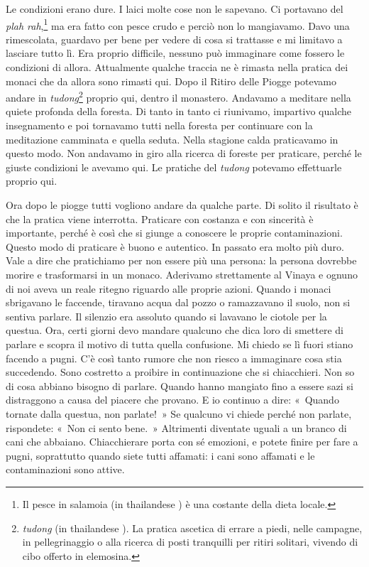 Le condizioni erano dure. I laici molte cose non le sapevano. Ci
portavano del \emph{plah rah},\footnote{Il pesce in salamoia (in
  thailandese )
  è una costante della dieta locale.} ma era fatto con pesce crudo e
perciò non lo mangiavamo. Davo una rimescolata, guardavo per bene per
vedere di cosa si trattasse e mi limitavo a lasciare tutto lì. Era
proprio difficile, nessuno può immaginare come fossero le condizioni di
allora. Attualmente qualche traccia ne è rimasta nella pratica dei
monaci che da allora sono rimasti qui. Dopo il Ritiro delle Piogge
potevamo andare in \emph{tudong}\footnote{\emph{tudong} (in thailandese
  ). La pratica ascetica di errare a piedi, nelle campagne, in
  pellegrinaggio o alla ricerca di posti tranquilli per ritiri solitari,
  vivendo di cibo offerto in elemosina.} proprio qui, dentro il
monastero. Andavamo a meditare nella quiete profonda della foresta. Di
tanto in tanto ci riunivamo, impartivo qualche insegnamento e poi
tornavamo tutti nella foresta per continuare con la meditazione
camminata e quella seduta. Nella stagione calda praticavamo in questo
modo. Non andavamo in giro alla ricerca di foreste per praticare, perché
le giuste condizioni le avevamo qui. Le pratiche del \emph{tudong}
potevamo effettuarle proprio qui.

Ora dopo le piogge tutti vogliono andare da qualche parte. Di solito il
risultato è che la pratica viene interrotta. Praticare con costanza e
con sincerità è importante, perché è così che si giunge a conoscere le
proprie contaminazioni. Questo modo di praticare è buono e autentico. In
passato era molto più duro. Vale a dire che pratichiamo per non essere
più una persona: la persona dovrebbe morire e trasformarsi in un monaco.
Aderivamo strettamente al Vinaya e ognuno di noi aveva un reale ritegno
riguardo alle proprie azioni. Quando i monaci sbrigavano le faccende,
tiravano acqua dal pozzo o ramazzavano il suolo, non si sentiva parlare.
Il silenzio era assoluto quando si lavavano le ciotole per la questua.
Ora, certi giorni devo mandare qualcuno che dica loro di smettere di
parlare e scopra il motivo di tutta quella confusione. Mi chiedo se lì
fuori stiano facendo a pugni. C'è così tanto rumore che non riesco a
immaginare cosa stia succedendo. Sono costretto a proibire in
continuazione che si chiacchieri. Non so di cosa abbiano bisogno di
parlare. Quando hanno mangiato fino a essere sazi si distraggono a causa
del piacere che provano. E io continuo a dire: «~Quando tornate dalla
questua, non parlate!~» Se qualcuno vi chiede perché non parlate,
rispondete: «~Non ci sento bene.~» Altrimenti diventate uguali a un
branco di cani che abbaiano. Chiacchierare porta con sé emozioni, e
potete finire per fare a pugni, soprattutto quando siete tutti affamati:
i cani sono affamati e le contaminazioni sono attive.

